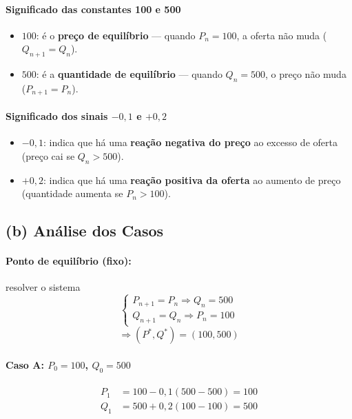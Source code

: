 \documentclass{article}
\begin{document}
\paragraph{Significado das constantes 100 e 500}

\begin{itemize}
\item $100$: é o \textbf{preço de equilíbrio} — quando $P_n = 100$, a
  oferta não muda ($Q_{n+1} = Q_n$).
\item $500$: é a \textbf{quantidade de equilíbrio} — quando
  $Q_n = 500$, o preço não muda ($P_{n+1} = P_n$).
\end{itemize}

\paragraph{Significado dos sinais $-0{,}1$ e $+0{,}2$}

\begin{itemize}
\item $-0{,}1$: indica que há uma \textbf{reação negativa do preço} ao
  excesso de oferta (preço cai se $Q_n > 500$).
\item $+0{,}2$: indica que há uma \textbf{reação positiva da oferta} ao
  aumento de preço (quantidade aumenta se $P_n > 100$).
\end{itemize}

\subsection*{(b) Análise dos Casos}

\paragraph{Ponto de equilíbrio (fixo):} resolver o sistema
\[
  \begin{cases}
    P_{n+1} = P_n \Rightarrow Q_n = 500\\
    Q_{n+1} = Q_n \Rightarrow P_n = 100
  \end{cases}
\]
\[
  \Rightarrow (P^*, Q^*) = (100, 500)
\]


\paragraph{Caso A: $P_0 = 100$, $Q_0 = 500$}

\[
\begin{aligned}
P_1 &= 100 - 0{,}1(500 - 500) = 100 \\
Q_1 &= 500 + 0{,}2(100 - 100) = 500
\end{aligned}
\]
\end{document}
